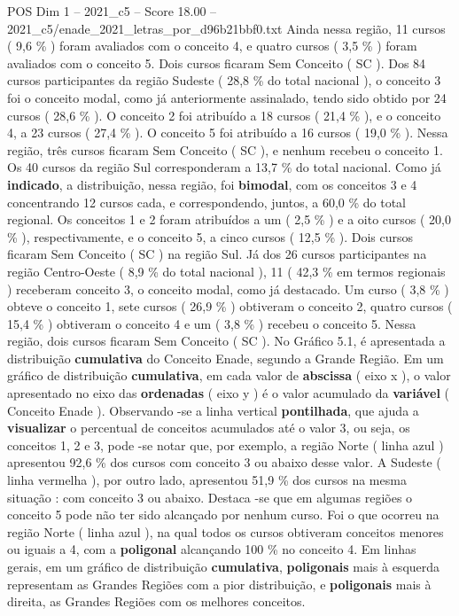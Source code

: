 \begin{textsample}{POS Dim 1 – 2021\_c5 – Score 18.00 – 2021\_c5/enade\_2021\_letras\_por\_d96b21bbf0.txt}
Ainda nessa região, 11 cursos ( 9,6 \% ) foram avaliados com o conceito 4, e quatro cursos ( 3,5 \% ) foram avaliados com o conceito 5.
Dois cursos ficaram Sem Conceito ( SC ).
Dos 84 cursos participantes da região Sudeste ( 28,8 \% do total nacional ), o conceito 3 foi o conceito modal, como já anteriormente assinalado, tendo sido obtido por 24 cursos ( 28,6 \% ).
O conceito 2 foi atribuído a 18 cursos ( 21,4 \% ), e o conceito 4, a 23 cursos ( 27,4 \% ).
O conceito 5 foi atribuído a 16 cursos ( 19,0 \% ).
Nessa região, três cursos ficaram Sem Conceito ( SC ), e nenhum recebeu o conceito 1.
Os 40 cursos da região Sul corresponderam a 13,7 \% do total nacional.
Como já \textbf{indicado}, a distribuição, nessa região, foi \textbf{bimodal}, com os conceitos 3 e 4 concentrando 12 cursos cada, e correspondendo, juntos, a 60,0 \% do total regional.
Os conceitos 1 e 2 foram atribuídos a um ( 2,5 \% ) e a oito cursos ( 20,0 \% ), respectivamente, e o conceito 5, a cinco cursos ( 12,5 \% ).
Dois cursos ficaram Sem Conceito ( SC ) na região Sul.
Já dos 26 cursos participantes na região Centro-Oeste ( 8,9 \% do total nacional ), 11 ( 42,3 \% em termos regionais ) receberam conceito 3, o conceito modal, como já destacado.
Um curso ( 3,8 \% ) obteve o conceito 1, sete cursos ( 26,9 \% ) obtiveram o conceito 2, quatro cursos ( 15,4 \% ) obtiveram o conceito 4 e um ( 3,8 \% ) recebeu o conceito 5.
Nessa região, dois cursos ficaram Sem Conceito ( SC ).
No Gráfico 5.1, é apresentada a distribuição \textbf{cumulativa} do Conceito Enade, segundo a Grande Região.
Em um gráfico de distribuição \textbf{cumulativa}, em cada valor de \textbf{abscissa} ( eixo x ), o valor apresentado no eixo das \textbf{ordenadas} ( eixo y ) é o valor acumulado da \textbf{variável} ( Conceito Enade ).
Observando -se a linha vertical \textbf{pontilhada}, que ajuda a \textbf{visualizar} o percentual de conceitos acumulados até o valor 3, ou seja, os conceitos 1, 2 e 3, pode -se notar que, por exemplo, a região Norte ( linha azul ) apresentou 92,6 \% dos cursos com conceito 3 ou abaixo desse valor.
A Sudeste ( linha vermelha ), por outro lado, apresentou 51,9 \% dos cursos na mesma situação : com conceito 3 ou abaixo.
Destaca -se que em algumas regiões o conceito 5 pode não ter sido alcançado por nenhum curso.
Foi o que ocorreu na região Norte ( linha azul ), na qual todos os cursos obtiveram conceitos menores ou iguais a 4, com a \textbf{poligonal} alcançando 100 \% no conceito 4.
Em linhas gerais, em um gráfico de distribuição \textbf{cumulativa}, \textbf{poligonais} mais à esquerda representam as Grandes Regiões com a pior distribuição, e \textbf{poligonais} mais à direita, as Grandes Regiões com os melhores conceitos.

\end{textsample}
